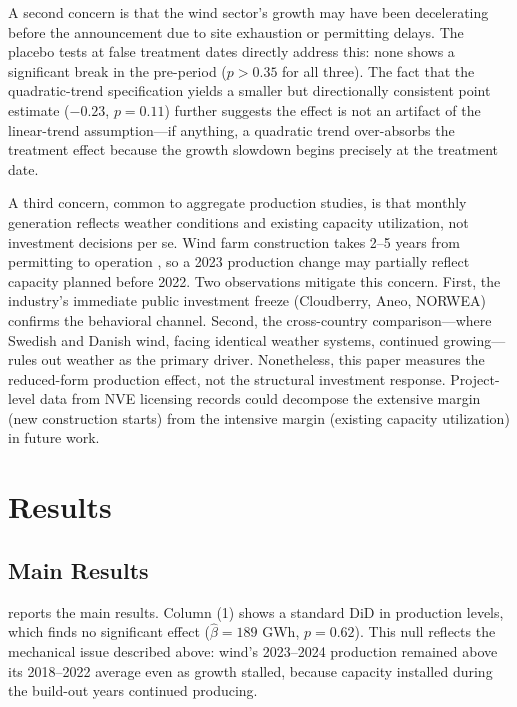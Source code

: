 \documentclass[12pt]{article}
\begin{document}
A second concern is that the wind sector's growth may have been decelerating before the announcement due to site exhaustion or permitting delays. The placebo tests at false treatment dates directly address this: none shows a significant break in the pre-period ($p > 0.35$ for all three). The fact that the quadratic-trend specification yields a smaller but directionally consistent point estimate ($-0.23$, $p = 0.11$) further suggests the effect is not an artifact of the linear-trend assumption---if anything, a quadratic trend over-absorbs the treatment effect because the growth slowdown begins precisely at the treatment date.

A third concern, common to aggregate production studies, is that monthly generation reflects weather conditions and existing capacity utilization, not investment decisions per se. Wind farm construction takes 2--5 years from permitting to operation \citep{nve2023wind}, so a 2023 production change may partially reflect capacity planned before 2022. Two observations mitigate this concern. First, the industry's immediate public investment freeze (Cloudberry, Aneo, NORWEA) confirms the behavioral channel. Second, the cross-country comparison---where Swedish and Danish wind, facing identical weather systems, continued growing---rules out weather as the primary driver. Nonetheless, this paper measures the reduced-form production effect, not the structural investment response. Project-level data from NVE licensing records could decompose the extensive margin (new construction starts) from the intensive margin (existing capacity utilization) in future work.


\section{Results}
\label{sec:results}

\subsection{Main Results}



 reports the main results. Column (1) shows a standard DiD in production levels, which finds no significant effect ($\hat{\beta} = 189$ GWh, $p = 0.62$). This null reflects the mechanical issue described above: wind's 2023--2024 production remained above its 2018--2022 average even as growth stalled, because capacity installed during the build-out years continued producing.
\end{document}

